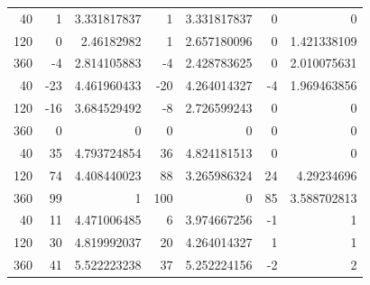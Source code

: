 \begin{tabular}{rrrrrrr}
40 & 1 & 3.331817837 & 1 & 3.331817837 & 0 & 0 \\
120 & 0 & 2.46182982 & 1 & 2.657180096 & 0 & 1.421338109 \\
360 & -4 & 2.814105883 & -4 & 2.428783625 & 0 & 2.010075631 \\
40 & -23 & 4.461960433 & -20 & 4.264014327 & -4 & 1.969463856 \\
120 & -16 & 3.684529492 & -8 & 2.726599243 & 0 & 0 \\
360 & 0 & 0 & 0 & 0 & 0 & 0 \\
40 & 35 & 4.793724854 & 36 & 4.824181513 & 0 & 0 \\
120 & 74 & 4.408440023 & 88 & 3.265986324 & 24 & 4.29234696 \\
360 & 99 & 1 & 100 & 0 & 85 & 3.588702813 \\
40 & 11 & 4.471006485 & 6 & 3.974667256 & -1 & 1 \\
120 & 30 & 4.819992037 & 20 & 4.264014327 & 1 & 1 \\
360 & 41 & 5.522223238 & 37 & 5.252224156 & -2 & 2 \\
\end{tabular}
